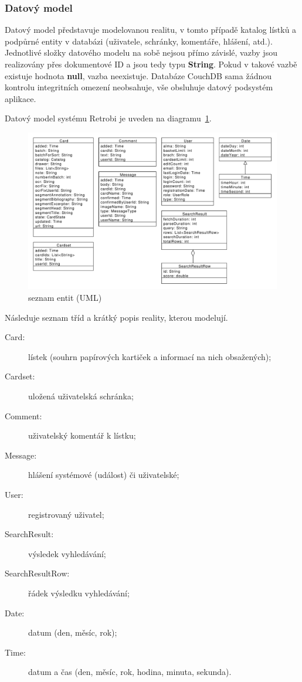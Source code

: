 \subsubsection{Datový model}

Datový model představuje modelovanou realitu, v tomto případě katalog lístků a podpůrné entity v databázi (uživatele, schránky, komentáře, hlášení, atd.). Jednotlivé složky datového modelu na sobě nejsou přímo závislé, vazby jsou realizovány přes dokumentové ID a jsou tedy typu {\bf String}. Pokud v takové vazbě existuje hodnota {\bf null}, vazba neexistuje. Databáze CouchDB sama žádnou kontrolu integritních omezení neobsahuje, vše obsluhuje datový podsystém aplikace. 

Datový model systému Retrobi je uveden na diagramu~\ref{fig:uml_entity}.

\begin{figure}
\centering
\includegraphics[width=\textwidth]{uml_entity.pdf}
\caption{seznam entit (UML)}
\label{fig:uml_entity}
\end{figure}

Následuje seznam tříd a krátký popis reality, kterou modelují.

\begin{description}
\item[Card:]{lístek (souhrn papírových kartiček a informací na nich obsažených);}
\item[Cardset:]{uložená uživatelská schránka;}
\item[Comment:]{uživatelský komentář k lístku;}
\item[Message:]{hlášení systémové (událost) či uživatelské;}
\item[User:]{registrovaný uživatel;}
\item[SearchResult:]{výsledek vyhledávání;}
\item[SearchResultRow:]{řádek výsledku vyhledávání;}
\item[Date:]{datum (den, měsíc, rok);}
\item[Time:]{datum a čas (den, měsíc, rok, hodina, minuta, sekunda).}
\end{description}

